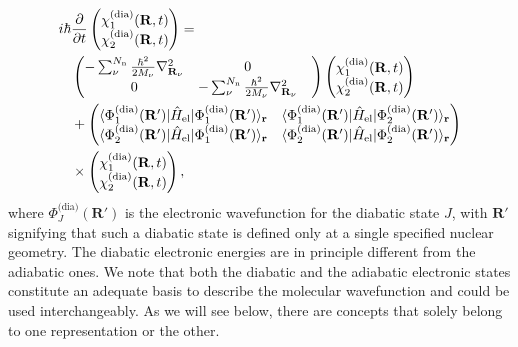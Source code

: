 \documentclass[9pt,bestpractices,pubversion]{livecoms}
\newcommand{\bs}{\mathbf}
\begin{document}
\begin{align} 
 i\hbar & \frac{\partial}{\partial t} 
     \begin{pmatrix}
        \chi_1^{\text{(dia)}}(\mathbf{R},t)  \\
        \chi_2^{\text{(dia)}}(\mathbf{R},t) \\
    \end{pmatrix} =  \notag \\
   & \begin{pmatrix}
        -\sum_\nu^{N_{\text{n}}}\frac{\hbar^2}{2M_\nu} \nabla_{\mathbf{R}_\nu}^2   & 0 \\
        0  & -\sum_\nu^{N_{\text{n}}}\frac{\hbar^2}{2M_\nu} \nabla_{\mathbf{R}_\nu}^2  & \\
    \end{pmatrix} 
    \begin{pmatrix}
        \chi_1^{\text{(dia)}}(\mathbf{R},t)  \\
        \chi_2^{\text{(dia)}}(\mathbf{R},t) \\
    \end{pmatrix}
    \notag \\
    &  + 
    \begin{pmatrix}
        \langle \Phi_1^{\text{(dia)}}(\bs R')  | \hat{H}_{\text{el}} | \Phi_1^{\text{(dia)}}(\bs R')  \rangle_{\bs r}    & \langle \Phi_1^{\text{(dia)}}(\bs R')  | \hat{H}_{\text{el}} | \Phi_2^{\text{(dia)}}(\bs R')  \rangle_{\bs r}   \\
        \langle \Phi_2^{\text{(dia)}}(\bs R')  | \hat{H}_{\text{el}} | \Phi_1^{\text{(dia)}}(\bs R')  \rangle_{\bs r}  & \langle \Phi_2^{\text{(dia)}}(\bs R')  | \hat{H}_{\text{el}} | \Phi_2^{\text{(dia)}}(\bs R')  \rangle_{\bs r}    \\
    \end{pmatrix} \notag \\
    & \times \begin{pmatrix}
        \chi_1^{\text{(dia)}}(\mathbf{R},t)  \\
        \chi_2^{\text{(dia)}}(\mathbf{R},t) \\
    \end{pmatrix}
   ,
\label{eq:matrixtdse2statesdiab}
\end{align}
\noindent where $\Phi_J^{\text{(dia)}}(\bs R')$ is the electronic wavefunction for the diabatic state $J$, with $\bs R'$ signifying that such a diabatic state is defined only at a single specified nuclear geometry. The diabatic electronic energies are in principle different from the adiabatic ones. We note that both the diabatic and the adiabatic electronic states constitute an adequate basis to describe the molecular wavefunction and could be used interchangeably. As we will see below, there are concepts that solely belong to one representation or the other. 
\end{document}
